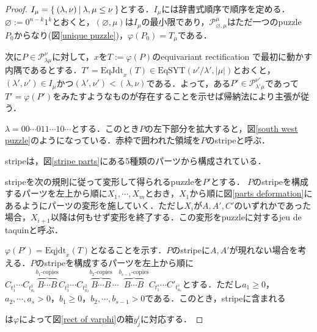 \begin{proof}
  $I_{\mu} = \left\{\:(\lambda,\nu)\:\middle|\:\lambda,\mu \leq \nu\:\right\}$とする．$I_{\mu}$には辞書式順序で順序を定める．$\varnothing:=0^{n-k}1^k$とおくと，$(\varnothing,\mu)$は$I_{\mu}$の最小限であり，$\mathcal{P}^\mu_{\varnothing,\mu}$はただ一つのpuzzle $P_0$からなり(図\ref{unique puzzle})，$\varphi(P_0)=T_\mu$である．
  
  

  次に$P\in\mathcal{P}^\nu_{\lambda\mu}$に対して，$x$を$T:=\varphi(P)$のequivariant rectification で最初に動かす内隅であるとする．$T'=\text{EqJdt}_{x}(T)\in \text{EqSYT}(\nu'/\lambda',|\mu|)$とおくと，$(\lambda',\nu')\in I_{\mu}$かつ$(\lambda',\nu') < (\lambda,\nu)$である．よって，ある$P'\in\mathcal{P}^{\nu'}_{\lambda'\mu}$であって$T' = \varphi(P')$をみたすようなものが存在することを示せば帰納法により主張が従う．

  $\lambda=00\cdots011\cdots10\cdots$とする．このとき$P$の左下部分を拡大すると，図\ref{south west puzzle}のようになっている．赤枠で囲われた領域を$P$のstripeと呼ぶ．

  

  stripeは，図\ref{stripe parts}にある5種類のパーツから構成されている．

  
  
  stripeを次の規則に従って変形して得られるpuzzleを$P'$とする．
  $P$のstripeを構成するパーツを左上から順に$X_1,\cdots,X_m$とおき，$X_1$から順に図\ref{parts deformation}にあるようにパーツの変形を施していく．ただし$X_i$が$A,A',C'$のいずれかであった場合，$X_{i+1}$以降は何もせず変形を終了する．この変形をpuzzleに対するjeu de taquinと呼ぶ．

  

  $\varphi(P') =\text{Eqjdt}_x(T)$となることを示す．$P$のstripeに$A,A'$が現れない場合を考える．$P$のstripeを構成するパーツを左上から順に$C_{t^1_1}\cdots C_{t^1_{a_1}}\overbrace{B\cdots B}^{b_1\text{-copies}} C_{t^2_1}\cdots C_{t^2_{a_2}} \overbrace{B\cdots B}^{b_2\text{-copies}}\cdots \overbrace{B\cdots B}^{b_{s-1}\text{-copies}} C_{t^s_1}\cdots C'_{t^s_{a_s}}$とする．ただし$a_1\geq 0$，$a_2,\cdots,a_s>0$，$b_1\geq 0$，$b_2,\cdots,b_{s-1}>0$である．このとき，stripeに含まれる
  は$\varphi$によって図\ref{rect of varphi}の箱$y^i_j$に対応する．


\end{proof}
